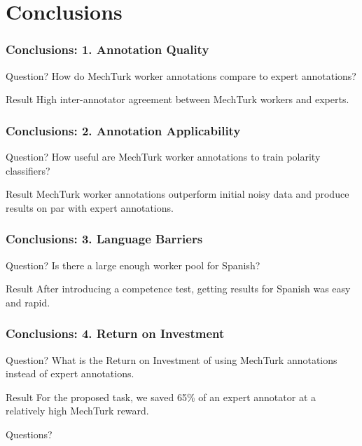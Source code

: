 \documentclass[10pt]{beamer}
\begin{document}
\section{Conclusions}

\begin{frame}
  \frametitle{Conclusions: 1. Annotation Quality}
\begin{block}{Question?}
How do MechTurk worker annotations compare to expert annotations?
\end{block}
\begin{block}{Result}
High inter-annotator agreement between MechTurk workers and experts. %
\end{block}
\end{frame}

\begin{frame}
  \frametitle{Conclusions: 2. Annotation Applicability}
\begin{block}{Question?}
How useful are MechTurk worker annotations to train polarity classifiers?
\end{block}
\begin{block}{Result}
MechTurk worker annotations outperform initial noisy data and produce results on par with expert annotations.
\end{block}
\end{frame}

\begin{frame}
  \frametitle{Conclusions: 3. Language Barriers}
\begin{block}{Question?}
Is there a large enough worker pool for Spanish?
\end{block}
\begin{block}{Result}
After introducing a competence test, getting results for Spanish was easy and rapid.
\end{block}
\end{frame}

\begin{frame}
  \frametitle{Conclusions: 4. Return on Investment}
\begin{block}{Question?}
What is the Return on Investment of using MechTurk annotations instead of expert annotations.
\end{block}
\begin{block}{Result}
For the proposed task, we saved 65\% of an expert annotator at a relatively high MechTurk reward.
\end{block}
\end{frame}

\begin{frame}
\vspace{3cm}
\begin{center}
  \begin{Large}Questions?\end{Large}
\end{center}
\vspace{3cm}\hspace{9cm}
\end{frame}
\end{document}
